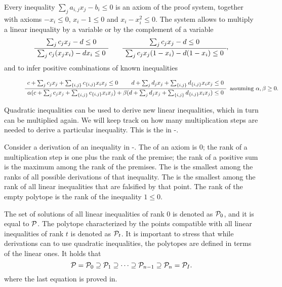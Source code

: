 \documentclass[a4paper,twoside,justified]{tufte-handout}
\begin{document}
Every inequality $ \sum_{j}a_{i,j}x_{j} - b_{i} \leq 0$ is an axiom of
the proof system, together with axioms $ - x_{i} \leq 0$, $ x_{i} - 1
\leq 0$ and $ x_{i} - x^{2}_{i} \leq 0$.  The system allows to multiply a
linear inequality by a variable or by the complement of a variable
\begin{equation}\label{eq:lsmultiplication}
\AxiomC{$\sum_{j}c_{j} x_{j} - d \leq 0$}
\UnaryInfC{$ \sum_{j}c_{j}(x_{j}x_{i}) - d x_{i} \leq 0$}
\DisplayProof
\qquad
\AxiomC{$ \sum_{j}c_{j} x_{j} - d \leq 0$}
\UnaryInfC{$ \sum_{j}c_{j}x_{j}(1-x_{i}) - d (1-x_{i}) \leq 0$}
\DisplayProof,
\end{equation}
%
and to infer positive combinations of known inequalities

\begin{figure*}
\begin{equation}
\RightLabel{\ assuming $\alpha, \beta \geq 0$.}
\AxiomC{$c+\sum_{j}c_{j} x_{j} + \sum_{\{i,j\}} c_{\{i,j\}}x_{i}x_{j}\leq 0$}
\AxiomC{$d+\sum_{j}d_{j} x_{j} + \sum_{\{i,j\}} d_{\{i,j\}}x_{i}x_{j}\leq 0$}
\BinaryInfC{%
$\alpha (c+\sum_{j}c_{j} x_{j} + \sum_{\{i,j\}} c_{\{i,j\}}x_{i}x_{j})+
\beta (d+\sum_{j}d_{j} x_{j} + \sum_{\{i,j\}} d_{\{i,j\}}x_{i}x_{j}) \leq 0$}
\DisplayProof
\end{equation}
\end{figure*}

Quadratic inequalities can be used to derive new linear inequalities,
which in turn can be multiplied again. We will keep track on how many
multiplication steps are needed to derive a particular
inequality. This is the  in
\Lovasz-\Schrijver.

\begin{definition}
  Consider a derivation of an inequality in \Lovasz-\Schrijver. The
   of an axiom is $ 0 $; the
  rank of a multiplication step is one plus the rank of the premise;
  the rank of a positive sum is the maximum among the rank of the
  premises.  The  is the smallest
  among the ranks of all possible derivations of that inequality. The
   is the smallest among the rank of
  all linear inequalities that are falsified by that point. The rank
  of the empty polytope is the rank of the inequality $ 1 \leq 0 $.
\end{definition}

The set of solutions of all linear inequalities of rank $ 0 $ is
denoted as $ \mathcal{P}_{0} $, and it is equal to $ \mathcal{P} $. The
polytope characterized by the points compatible with all linear
inequalities of rank $ t $ is denoted as $ \mathcal{P}_{t} $. It is
important to stress that while derivations can to use quadratic
inequalities, the polytopes are defined in terms of the linear
ones. It holds that
%
\begin{equation}
  \mathcal{P}=\mathcal{P}_{0} \supseteq \mathcal{P}_{1} \supseteq \cdots
  \supseteq \mathcal{P}_{n-1} \supseteq \mathcal{P}_{n}=\mathcal{P}_{I}.
\end{equation}
%
where the last equation is proved in\cite{lovasz1991cones}.
\end{document}
